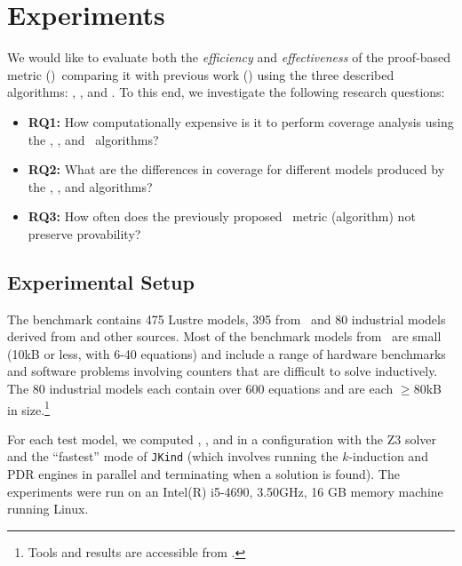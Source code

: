 \section{Experiments}
\label{sec:experiments}

We would like to evaluate both the {\em efficiency} and {\em
  effectiveness} of the proof-based metric (\ivccov)~comparing it with previous work (\nondetcov) using the three described algorithms: \ucalg, \ucbfalg, and \mustalg. To this end, we investigate the following research questions:
\begin{itemize}
    \item \textbf{RQ1:} How computationally expensive is it to perform coverage analysis using the \ucalg, \ucbfalg, and \mustalg\ algorithms?
    \item \textbf{RQ2:} What are the differences in coverage for different models produced by the \ucalg, \ucbfalg, and \mustalg algorithms?
    \item \textbf{RQ3:} How often does the previously proposed \nondetcov\ metric (\mustalg algorithm) not preserve provability?
\end{itemize}

\subsection{Experimental Setup}

The benchmark contains 475 Lustre models, 395 from~\cite{Hagen08:FMCAD} and 80 industrial models derived from \cite{hilt2013} and other sources.  Most of the benchmark models from~\cite{Hagen08:FMCAD} are small (10kB or less, with 6-40 equations) and include a range of hardware benchmarks and software problems involving counters that are difficult to solve inductively.
The 80 industrial models each contain over 600 equations and are each $\geq$80kB in size.\footnote{Tools and results are accessible from \cite{anoexpr}.}

For each test model, we computed \ucalg, \ucbfalg, and \mustalg in a configuration with
the Z3 solver and the ``fastest'' mode of \texttt{JKind} (which involves running the $k$-induction and PDR engines
in parallel and terminating when a solution is found). The experiments were run on an
Intel(R) i5-4690, 3.50GHz, 16 GB memory machine running Linux.





